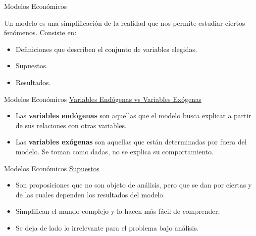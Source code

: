 \documentclass{beamer}
\begin{document}
\begin{frame}{Modelos Económicos}

Un modelo es una simplificación de la realidad que nos permite estudiar ciertos fenómenos. Consiste en: 

\begin{itemize}
    \item Definiciones que describen el conjunto de variables elegidas.
    \item Supuestos. 
    \item Resultados.
\end{itemize}
\end{frame}

\begin{frame}{Modelos Económicos}
    \underline{Variables Endógenas vs Variables Exógenas}
    
    \bigskip
    
    \begin{itemize}
        \item Las \textbf{variables endógenas} son aquellas que el modelo busca explicar a partir de sus relaciones con otras variables. 
        \item Las \textbf{variables exógenas} son aquellas que están determinadas por fuera del modelo. Se toman como dadas, no se explica su comportamiento. 
    \end{itemize}
\end{frame}

\begin{frame}{Modelos Económicos}
    \underline{Supuestos}
    
    \bigskip
    
    \begin{itemize}
        \item Son proposiciones que no son objeto de análisis, pero que se dan por ciertas y de las cuales dependen los resultados del modelo. 
        \item Simplifican el mundo complejo y lo hacen más fácil de comprender.
        \item Se deja de lado lo irrelevante para el problema bajo análisis.
    \end{itemize}
\end{frame}
\end{document}
